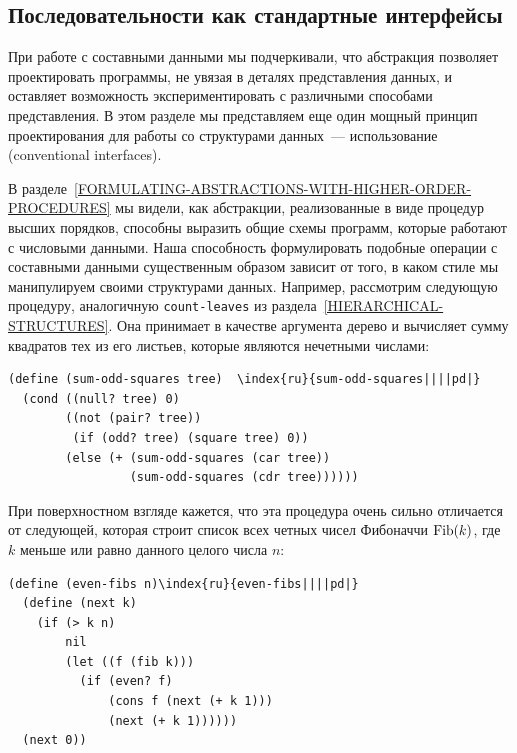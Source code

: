 \subsection{Последовательности как стандартные интерфейсы}
\label{SEQUENCES-AS-CONVENTIONAL-INTERFACES}


При работе с составными данными мы
подчеркивали,
что абстракция позволяет проектировать программы, не увязая в деталях
представления данных, и оставляет возможность
экспериментировать с различными способами представления.  В этом
разделе мы представляем еще один мощный принцип проектирования для
работы со структурами данных~--- использование 
 (conventional interfaces).

В разделе~\ref{FORMULATING-ABSTRACTIONS-WITH-HIGHER-ORDER-PROCEDURES} 
мы видели, как абстракции, реализованные в виде процедур высших
порядков, способны выразить общие схемы программ, которые работают с
числовыми данными.  Наша способность формулировать подобные операции с 
составными данными существенным образом зависит от того, в каком стиле 
мы манипулируем своими структурами данных.  Например, рассмотрим
следующую процедуру, аналогичную {\tt count-leaves} из
раздела~\ref{HIERARCHICAL-STRUCTURES}.  Она принимает
в качестве аргумента дерево и вычисляет сумму квадратов тех из его
листьев, которые являются нечетными числами:

\begin{Verbatim}[fontsize=\small]
(define (sum-odd-squares tree)  \index{ru}{sum-odd-squares||||pd|}
  (cond ((null? tree) 0)
        ((not (pair? tree))
         (if (odd? tree) (square tree) 0))
        (else (+ (sum-odd-squares (car tree))
                 (sum-odd-squares (cdr tree))))))
\end{Verbatim}
При поверхностном взгляде кажется, что эта процедура очень сильно
отличается от следующей, которая строит список всех четных чисел
Фибоначчи $\mathop{\rm Fib}(k)$, где $k$ меньше
или равно данного целого числа $n$:

\begin{Verbatim}[fontsize=\small]
(define (even-fibs n)\index{ru}{even-fibs||||pd|}
  (define (next k)
    (if (> k n)
        nil
        (let ((f (fib k)))
          (if (even? f)
              (cons f (next (+ k 1)))
              (next (+ k 1))))))
  (next 0))
\end{Verbatim}

